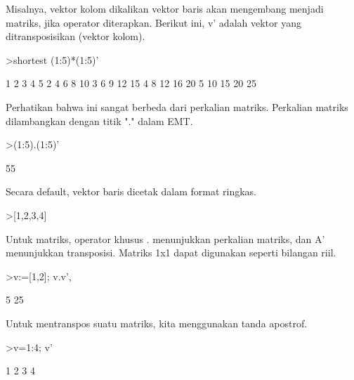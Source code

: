 \documentclass[a4paper,10pt]{article}
\begin{document}
\begin{eulernotebook}
\begin{eulercomment}
\begin{eulercomment}
\begin{eulercomment}
\begin{eulercomment}
\begin{eulercomment}
\begin{eulercomment}
\begin{eulercomment}
Misalnya, vektor kolom dikalikan vektor baris akan mengembang menjadi
matriks, jika operator diterapkan. Berikut ini, v' adalah vektor yang
ditransposisikan (vektor kolom).
\end{eulercomment}
\begin{eulerprompt}
>shortest (1:5)*(1:5)'
\end{eulerprompt}
\begin{euleroutput}
       1      2      3      4      5 
       2      4      6      8     10 
       3      6      9     12     15 
       4      8     12     16     20 
       5     10     15     20     25 
\end{euleroutput}
\begin{eulercomment}
Perhatikan bahwa ini sangat berbeda dari perkalian matriks. Perkalian
matriks dilambangkan dengan titik "." dalam EMT.
\end{eulercomment}
\begin{eulerprompt}
>(1:5).(1:5)'
\end{eulerprompt}
\begin{euleroutput}
  55
\end{euleroutput}
\begin{eulercomment}
Secara default, vektor baris dicetak dalam format ringkas.
\end{eulercomment}
\begin{eulerprompt}
>[1,2,3,4]
\end{eulerprompt}
\begin{euleroutput}
  [1,  2,  3,  4]
\end{euleroutput}
\begin{eulercomment}
Untuk matriks, operator khusus . menunjukkan perkalian matriks, dan A'
menunjukkan transposisi. Matriks 1x1 dapat digunakan seperti bilangan
riil.
\end{eulercomment}
\begin{eulerprompt}
>v:=[1,2]; v.v', %
\end{eulerprompt}
\begin{euleroutput}
  5
  25
\end{euleroutput}
\begin{eulercomment}
Untuk mentranspos suatu matriks, kita menggunakan tanda apostrof.
\end{eulercomment}
\begin{eulerprompt}
>v=1:4; v'
\end{eulerprompt}
\begin{euleroutput}
              1 
              2 
              3 
              4 
\end{euleroutput}

\end{eulercomment}
\end{eulercomment}
\end{eulercomment}
\end{eulercomment}
\end{eulercomment}
\end{eulercomment}
\end{eulernotebook}
\end{document}
